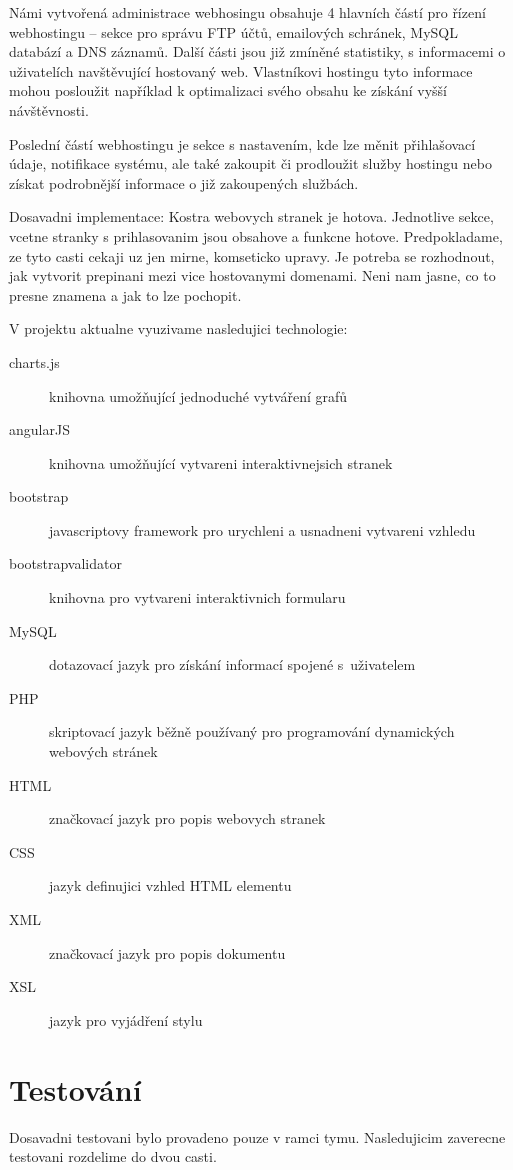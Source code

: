 \documentclass[11pt,a4paper]{article}
\begin{document}
    Námi vytvořená administrace webhosingu obsahuje 4 hlavních částí pro řízení
    webhostingu -- sekce pro správu FTP účtů, emailových schránek, MySQL databází
    a DNS záznamů. Další části jsou již zmíněné statistiky, s informacemi o
    uživatelích navštěvující hostovaný web. Vlastníkovi hostingu tyto informace
    mohou posloužit například k optimalizaci svého obsahu ke získání vyšší návštěvnosti.

    Poslední částí webhostingu je sekce s nastavením, kde lze měnit přihlašovací
    údaje, notifikace systému, ale také zakoupit či prodloužit služby hostingu
    nebo získat podrobnější informace o již zakoupených službách.

    Dosavadni implementace:
    Kostra webovych stranek je hotova. Jednotlive sekce, vcetne stranky s prihlasovanim jsou
    obsahove a funkcne hotove. Predpokladame, ze tyto casti cekaji uz jen mirne, komseticko
    upravy. Je potreba se rozhodnout, jak vytvorit prepinani mezi vice hostovanymi domenami. 
    Neni nam jasne, co to presne znamena a jak to lze pochopit.


    V projektu aktualne vyuzivame nasledujici technologie:
    \begin{description}
      \item[charts.js] knihovna umožňující jednoduché vytváření grafů
      \item[angularJS] knihovna umožňující vytvareni interaktivnejsich stranek
      \item[bootstrap] javascriptovy framework pro urychleni a usnadneni vytvareni vzhledu
      \item[bootstrapvalidator] knihovna pro vytvareni interaktivnich formularu
      \item[MySQL] dotazovací jazyk pro získání informací spojené s~uživatelem
      \item[PHP] skriptovací jazyk běžně používaný pro programování
                   dynamických webových stránek
      \item[HTML] značkovací jazyk pro popis webovych stranek
      \item[CSS] jazyk definujici vzhled HTML elementu
      \item[XML] značkovací jazyk pro popis dokumentu
      \item[XSL] jazyk pro vyjádření stylu
    \end{description}

  \section{Testování}
  Dosavadni testovani bylo provadeno pouze v ramci tymu. Nasledujicim zaverecne
  testovani rozdelime do dvou casti. 
\end{document}
